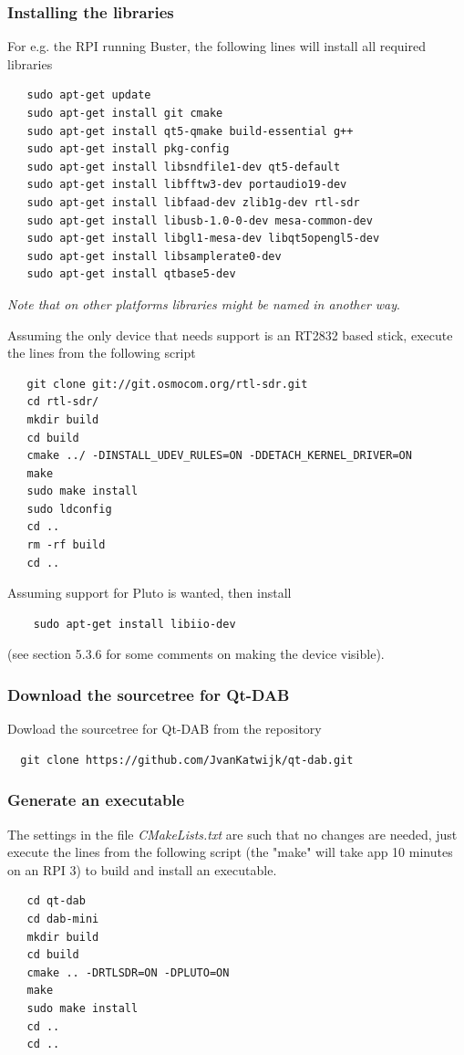 \documentclass[12pt]{article}
\begin{document}
\subsubsection{Installing the libraries}
For e.g. the RPI running Buster, the following lines
will install all required libraries
{\small
\begin{verbatim}
   sudo apt-get update
   sudo apt-get install git cmake
   sudo apt-get install qt5-qmake build-essential g++
   sudo apt-get install pkg-config
   sudo apt-get install libsndfile1-dev qt5-default
   sudo apt-get install libfftw3-dev portaudio19-dev 
   sudo apt-get install libfaad-dev zlib1g-dev rtl-sdr
   sudo apt-get install libusb-1.0-0-dev mesa-common-dev
   sudo apt-get install libgl1-mesa-dev libqt5opengl5-dev
   sudo apt-get install libsamplerate0-dev 
   sudo apt-get install qtbase5-dev
\end{verbatim}
}
\par
{\it Note that on other platforms libraries might be named in another way}.
\par
Assuming the only device that needs support is an RT2832 based stick,
execute the lines from the following script
{\small
\begin{verbatim}
   git clone git://git.osmocom.org/rtl-sdr.git
   cd rtl-sdr/
   mkdir build
   cd build
   cmake ../ -DINSTALL_UDEV_RULES=ON -DDETACH_KERNEL_DRIVER=ON
   make
   sudo make install
   sudo ldconfig
   cd ..
   rm -rf build
   cd ..
\end{verbatim}
}
Assuming support for Pluto is wanted, then install
\begin{verbatim}
	sudo apt-get install libiio-dev
\end{verbatim}
(see section 5.3.6 for some comments on making the device visible).
\par
\subsubsection{Download the sourcetree for Qt-DAB}
Dowload the sourcetree for Qt-DAB from the repository
{\small
\begin{verbatim}
  git clone https://github.com/JvanKatwijk/qt-dab.git
\end{verbatim}
}
\subsubsection{Generate an executable}
The settings in the file {\em CMakeLists.txt} are such that no changes
are needed, just execute the lines from the following script
(the "make" will take app 10 minutes on an RPI 3) to build and
install an executable.
{\small
\begin{verbatim}
   cd qt-dab
   cd dab-mini
   mkdir build
   cd build
   cmake .. -DRTLSDR=ON -DPLUTO=ON
   make
   sudo make install
   cd ..
   cd ..
\end{verbatim}
}
\end{document}
